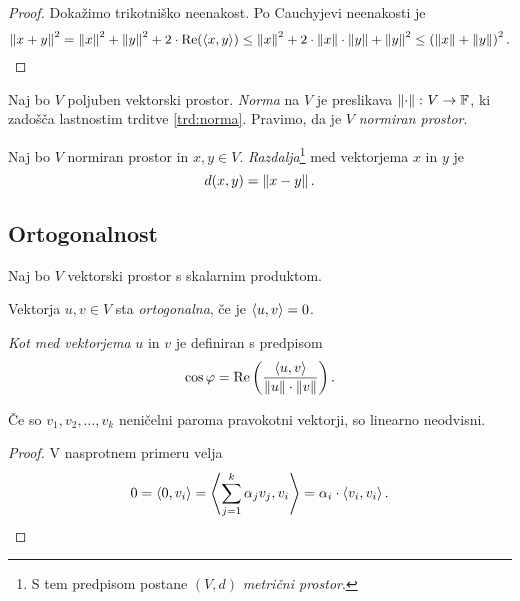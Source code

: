 \documentclass[12pt, a4paper]{article}
\begin{document}
\begin{proof}
Dokažimo trikotniško neenakost. Po Cauchyjevi neenakosti je
\[
\left\lVert x+y\right\rVert^2=\left\lVert x\right\rVert^2+\left\lVert y\right\rVert^2+2\cdot\operatorname{Re}(\left\langle x,y\right\rangle)\leq\left\lVert x\right\rVert^2+2\cdot\left\lVert x\right\rVert\cdot\left\lVert y\right\rVert+\left\lVert y\right\rVert^2\leq\left(\left\lVert x\right\rVert+\left\lVert y\right\rVert\right)^2.\qedhere
\]
\end{proof}

\begin{definicija}
Naj bo $V$ poljuben vektorski prostor. \emph{Norma} na $V$ je preslikava $\left\lVert \cdot\right\rVert\colon V\to\mathbb{F}$, ki zadošča lastnostim trditve \ref{trd:norma}. Pravimo, da je $V$ \emph{normiran prostor}.
\end{definicija}

\begin{definicija}
Naj bo $V$ normiran prostor in $x,y\in V$. \emph{Razdalja}\footnote{S tem predpisom postane $(V,d)$ \emph{metrični prostor}.} med vektorjema $x$ in $y$ je
\[
d(x,y)=\left\lVert x-y\right\rVert.
\]
\end{definicija}

\newpage

\subsection{Ortogonalnost}

Naj bo $V$ vektorski prostor s skalarnim produktom.

\begin{okvir}
\begin{definicija}
Vektorja $u,v\in V$ sta \emph{ortogonalna}, če je $\left\langle u,v\right\rangle=0$.
\end{definicija}
\end{okvir}

\begin{definicija}
\emph{Kot med vektorjema} $u$ in $v$ je definiran s predpisom
\[
\cos\varphi=\operatorname{Re}\left(\frac{\left\langle u,v\right\rangle}{\left\lVert u\right\rVert\cdot\left\lVert v\right\rVert}\right).
\]
\end{definicija}

\begin{trditev}
Če so $v_1,v_2,\dots,v_k$ neničelni paroma pravokotni vektorji, so linearno neodvisni.
\end{trditev}

\begin{proof}
V nasprotnem primeru velja
\[
0=\left\langle 0,v_i\right\rangle=\left\langle \sum_{j=1}^k\alpha_jv_j,v_i\right\rangle=\alpha_i\cdot\left\langle v_i,v_i\right\rangle.\qedhere
\]
\end{proof}
\end{document}
